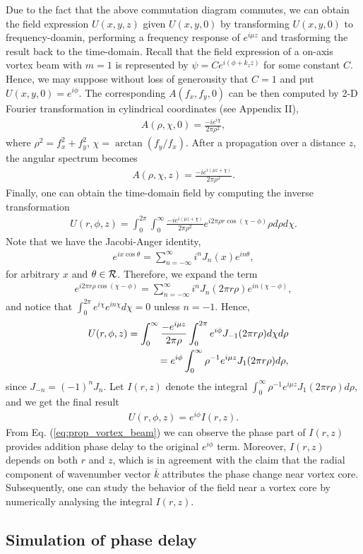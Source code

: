 Due to the fact that the above commutation diagram commutes, we can obtain the field expression $U(x, y, z)$ given $U(x, y, 0)$ by transforming $U(x, y, 0)$ to frequency-doamin, performing a frequency response of $e^{i \mu z}$ and trasforming the result back to the time-domain. Recall that the field expression of a on-axis vortex beam with $m = 1$ is represented by $\psi = Ce^{i (\phi + k_z z)}$ for some constant $C$. Hence, we may suppose without loss of generousity that $C = 1$ and put $U(x, y, 0) = e^{i\phi}$. The corresponding $A(f_x, f_y, 0)$ can be then computed by 2-D Fourier transformation in cylindrical coordinates (see Appendix II),
\begin{eqnarray}
	A(\rho, \chi, 0) = \frac{-i e^{i\chi}}{2\pi \rho^2},
\end{eqnarray}
where $\rho^2 = f_x^2 + f_y^2$, $ \chi = \arctan(f_y/f_x)$. After a propagation over a distance $z$, the angular spectrum becomes
\begin{eqnarray}
	A(\rho, \chi, z) = \frac{-i e^{i(\mu z + \chi)}}{2\pi \rho^2}.
\end{eqnarray}
Finally, one can obtain the time-domain field by computing the inverse transformation
\begin{eqnarray}
	U(r, \phi, z) =  \int_{0}^{2\pi} \int_{0}^{\infty} \frac{-i e^{i(\mu z + \chi)}}{2\pi \rho^2}e^{i 2\pi \rho r \cos(\chi - \phi)} \rho d\rho d\chi.
	\nonumber
\end{eqnarray}
Note that we have the Jacobi-Anger identity,
\begin{eqnarray}
	e^{ix\cos\theta} = \sum_{n = -\infty}^{\infty} i^n J_{n}(x) e^{i n \theta},
\end{eqnarray}
for arbitrary $x$ and  $\theta \in {\cal R}$. Therefore, we expand the term
\begin{eqnarray}
	e^{i 2 \pi r \rho \cos(\chi - \phi)} = 
	\sum_{n = -\infty}^{\infty} i^{n} J_n(2 \pi r \rho) e^{i n (\chi - \phi)},
	\nonumber
\end{eqnarray}
and notice that $ \int_{0}^{2\pi} e^{i \chi} e^{i n \chi} d\chi = 0$ unless $n = -1$. Hence,
\begin{eqnarray}
	&&U(r, \phi, z) = \int_{0}^{\infty} \frac{- e^{i \mu z}}{2 \pi \rho} \int_{0}^{2\pi} e^{i\phi} J_{-1}(2 \pi r \rho) d\chi d\rho
	\nonumber\\
	&& \hspace{0.5in} = e^{i \phi} \int_{0}^{\infty} \rho^{-1} e^{i \mu z} J_1(2 \pi r \rho) d\rho,
\end{eqnarray}
since $J_{-n} = (-1)^n J_{n}$. Let $I(r, z)$ denote the integral $\int_{0}^{\infty} \rho^{-1} e^{i \mu z} J_1 (2 \pi r \rho) d\rho$, and we get the final result
\begin{eqnarray}
	U(r, \phi, z) = e^{i\phi} I(r, z).
	\label{eq:prop_vortex_beam}
\end{eqnarray}
From Eq. (\ref{eq:prop_vortex_beam}) we can observe the phase part of $I(r, z)$ provides addition phase delay to the original $e^{i \phi}$ term. Moreover, $I(r, z)$ depends on both $r$ and $z$, which is in agreement with the claim that the radial component of wavenumber vector $\bar{k}$ attributes the phase change near vortex core. Subsequently, one can study the behavior of the field near a vortex core by numerically analysing the integral $I(r, z)$.
\subsection{Simulation of phase delay}